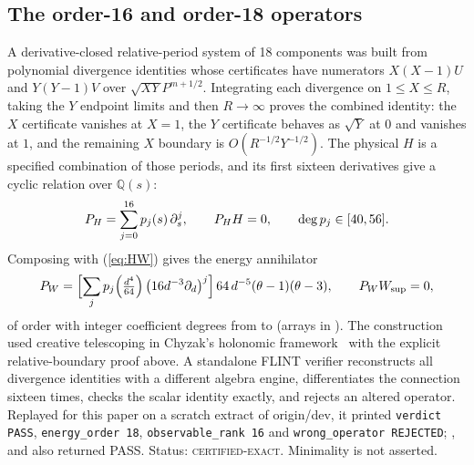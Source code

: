 \documentclass[aps,prd,onecolumn,amsmath,amssymb,longbibliography,floatfix,nofootinbib]{revtex4-2}
\newcommand{\Wsup}{W_{\mathrm{sup}}}
\newcommand{\st}[1]{\textsc{#1}}
\begin{document}
\subsection{The order-16 and order-18 operators}
A derivative-closed relative-period system of 18 components was built from \DivergenceColsVal{} polynomial divergence identities whose certificates have numerators $X(X-1)U$ and $Y(Y-1)V$ over $\sqrt{XY}P^{m+1/2}$. Integrating each divergence on $1\le X\le R$, taking the $Y$ endpoint limits and then $R\to\infty$ proves the combined identity: the $X$ certificate vanishes at $X=1$, the $Y$ certificate behaves as $\sqrt{Y}$ at $0$ and vanishes at $1$, and the remaining $X$ boundary is $O(R^{-1/2}Y^{-1/2})$. The physical $H$ is a specified combination of those periods, and its first sixteen derivatives give a cyclic relation over $\mathbb{Q}(s)$:
\begin{equation}
P_H=\sum_{j=0}^{16}p_j(s)\,\partial_s^j,\qquad P_H H=0,\qquad \deg p_j\in[40,56].
\end{equation}
Composing with (\ref{eq:HW}) gives the energy annihilator
\begin{equation}
P_W=\Bigl[\sum_{j}p_j\!\left(\tfrac{d^4}{64}\right)\bigl(16d^{-3}\partial_d\bigr)^j\Bigr]\,64\,d^{-5}(\theta-1)(\theta-3),\qquad P_W\Wsup=0,
\end{equation}
of order \EnergyOrderVal{} with integer coefficient degrees from \EnergyDegMinVal{} to \EnergyDegMaxVal{} (arrays in ). The construction used creative telescoping in Chyzak's holonomic framework~\cite{Chyzak2000} with the explicit relative-boundary proof above. A standalone FLINT verifier reconstructs all \DivergenceColsVal{} divergence identities with a different algebra engine, differentiates the connection sixteen times, checks the scalar identity exactly, and rejects an altered operator. Replayed for this paper on a scratch extract of origin/dev, it printed \texttt{verdict PASS}, \texttt{energy\_order 18}, \texttt{observable\_rank 16} and \texttt{wrong\_operator REJECTED}; ,  and  also returned PASS. Status: \st{certified-exact}. Minimality is not asserted.
\end{document}
